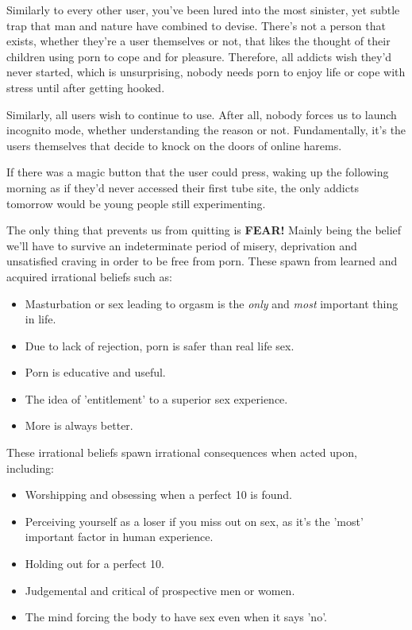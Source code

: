 \documentclass[easypeasy.tex]{subfiles}
\begin{document}
Similarly to every other user, you've been lured into the most sinister, yet subtle trap that man and nature have combined to devise. There's not a person that exists, whether they're a user themselves or not, that likes the thought of their children using porn to cope and for pleasure. Therefore, all addicts wish they'd never started, which is unsurprising, nobody needs porn to enjoy life or cope with stress until after getting hooked.

Similarly, all users wish to continue to use. After all, nobody forces us to launch incognito mode, whether understanding the reason or not. Fundamentally, it's the users themselves that decide to knock on the doors of online harems.

If there was a magic button that the user could press, waking up the following morning as if they'd never accessed their first tube site, the only addicts tomorrow would be young people still experimenting.

The only thing that prevents us from quitting is \textbf{FEAR!} Mainly being the belief we'll have to survive an indeterminate period of misery, deprivation and unsatisfied craving in order to be free from porn. These spawn from learned and acquired irrational beliefs such as:
    \begin{itemize}
      \item Masturbation or sex leading to orgasm is the \textit{only} and \textit{most} important thing in life.
      \item Due to lack of rejection, porn is safer than real life sex.
      \item Porn is educative and useful.
      \item The idea of 'entitlement' to a superior sex experience.
      \item More is always better.
    \end{itemize}
These irrational beliefs spawn irrational consequences when acted upon, including:
  \begin{itemize}
    \item Worshipping and obsessing when a perfect 10 is found.
    \item Perceiving yourself as a loser if you miss out on sex, as it's the 'most' important factor in human experience.
    \item Holding out for a perfect 10.
    \item Judgemental and critical of prospective men or women.
    \item The mind forcing the body to have sex even when it says 'no'.
  \end{itemize}
\end{document}
